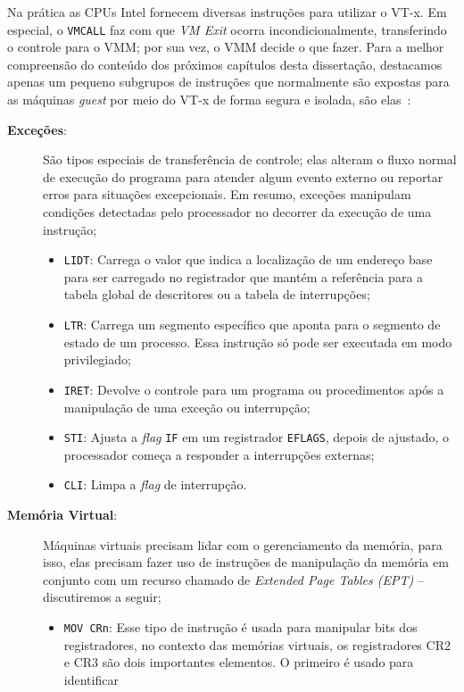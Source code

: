 Na prática as CPUs Intel fornecem diversas instruções para utilizar o VT-x. Em
especial, o \texttt{VMCALL} faz com que \emph{VM Exit} ocorra
incondicionalmente, transferindo o controle para o VMM; por sua vez, o VMM
decide o que fazer. Para a melhor compreensão do conteúdo dos próximos
capítulos desta dissertação, destacamos apenas um pequeno subgrupos de
instruções que normalmente são expostas para as máquinas \emph{guest} por meio
do VT-x de forma segura e isolada, são elas~\citep{intelmanual}:

\begin{description}
	\item [\textbf{Exceções}:] São tipos especiais de transferência de
controle; elas alteram o fluxo normal de execução do programa para atender
algum evento externo ou reportar erros para situações excepcionais. Em resumo,
exceções manipulam condições detectadas pelo processador no decorrer da
execução de uma instrução;
		\begin{itemize}
			\item \texttt{LIDT}: Carrega o valor que indica a localização de um
endereço base para ser carregado no registrador que mantém a referência para a
tabela global de descritores ou a tabela de interrupções;
			\item \texttt{LTR}: Carrega um segmento específico que aponta para o
segmento de estado de um processo. Essa instrução só pode ser executada em modo
privilegiado;
			\item \texttt{IRET}: Devolve o controle para um programa ou procedimentos
após a manipulação de uma exceção ou interrupção;
			\item \texttt{STI}: Ajusta a \emph{flag} \texttt{IF} em um registrador
\texttt{EFLAGS}, depois de ajustado, o processador começa a responder a
interrupções externas;
			\item \texttt{CLI}: Limpa a \emph{flag} de interrupção.
		\end{itemize}
  \item [\textbf{Memória Virtual}:]
Máquinas virtuais precisam lidar com o gerenciamento da memória, para isso,
elas precisam fazer uso de instruções de manipulação da memória em conjunto com
um recurso chamado de \emph{Extended Page Tables (EPT)} -- discutiremos a seguir;
		\begin{itemize}
			\item \texttt{MOV CRn}: Esse tipo de instrução é usada para manipular
bits dos registradores, no contexto das memórias virtuais, os registradores CR2
e CR3 são dois importantes elementos. O primeiro é usado para identificar

\end{itemize}
\end{description}
